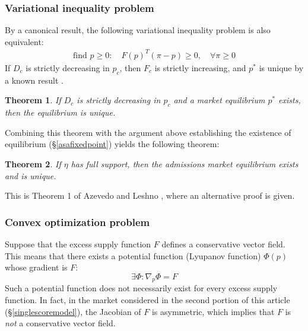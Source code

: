 \documentclass[12pt]{article}
\newtheorem{theorem}{Theorem}
\theoremstyle{definition}
\begin{document}
\subsubsection{Variational inequality problem}
By a canonical result, the following variational inequality problem is also equivalent:
\begin{align*}
\text{find } p \geq 0:\quad F(p)^T (\pi-p) \geq 0, \quad \forall \pi \geq 0
\end{align*}
If $D_c$ is strictly decreasing in $p_c$, then $F_c$ is strictly increasing, and $p^*$ is unique by a known result \parencite[][\S2]{theoryofvariationalinequalities}.
\begin{theorem} \label{demanddecreasingimpliesunique}
If $D_c$ is strictly decreasing in $p_c$ and a market equilibrium $p^*$ exists, then the equilibrium is unique.
\end{theorem}

Combining this theorem with the argument above establishing the existence of equilibrium (\S\ref{asafixedpoint}) yields the following theorem:
\begin{theorem} \label{fullsupportimpliesunique}
If $\eta$ has full support, then the admissions market equilibrium exists and is unique.
\end{theorem}
This is Theorem 1 of Azevedo and Leshno \parencite*{supplydemandfw}, where an alternative proof is given.

\subsubsection{Convex optimization problem}
Suppose that the excess supply function $F$ defines a conservative vector field. This means that there exists a potential function (Lyupanov function) $\Phi(p)$ whose gradient is $F$:
\[\exists \Phi: \nabla_p \Phi = F\]
Such a potential function does not necessarily exist for every excess supply function. In fact, in the market considered in the second portion of this article (\S\ref{singlescoremodel}), the Jacobian of $F$ is asymmetric, which implies that $F$ is \emph{not} a conservative vector field. 
\end{document}
